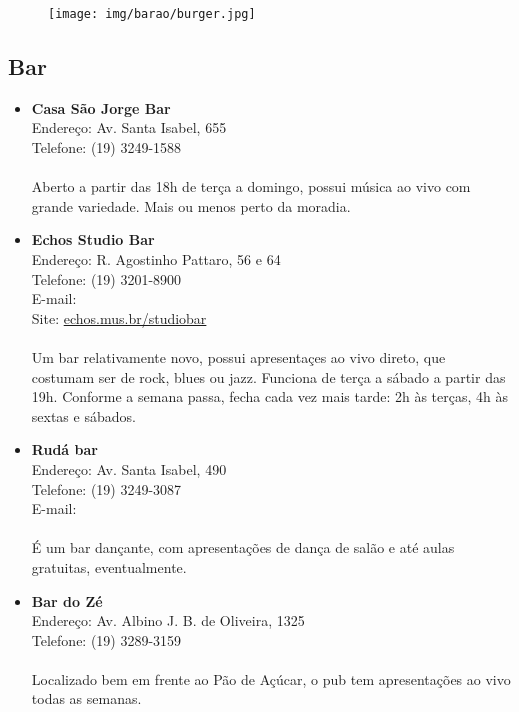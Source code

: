 \begin{figure}[h!]
  \centering
  \texttt{[image: img/barao/burger.jpg]}
\end{figure}

\subsection{Bar}

\begin{itemize}
\item \textbf{Casa São Jorge Bar}
  \\Endereço: Av. Santa Isabel, 655
  \\Telefone: (19) 3249-1588
  \\
  \\Aberto a partir das 18h de terça a domingo, possui música ao vivo com
  grande variedade. Mais ou menos perto da moradia.

\item \textbf{Echos Studio Bar}
  \\Endereço: R. Agostinho Pattaro, 56 e 64
  \\Telefone: (19) 3201-8900
  \\E-mail: 
  \\Site: \url{echos.mus.br/studiobar}
  \\
  \\Um bar relativamente novo, possui apresentaçes ao vivo direto, que costumam
  ser de rock, blues ou jazz. Funciona de terça a sábado a partir das 19h.
  Conforme a semana passa, fecha cada vez mais tarde: 2h às terças, 4h às
  sextas e sábados.

\item \textbf{Rudá bar}
  \\Endereço: Av. Santa Isabel, 490
  \\Telefone: (19) 3249-3087
  \\E-mail: 
  \\
  \\É um bar dançante, com apresentações de dança de salão e até aulas
  gratuitas, eventualmente.

\item \textbf{Bar do Zé}
  \\Endereço: Av. Albino J. B. de Oliveira, 1325
  \\Telefone: (19) 3289-3159
  \\
  \\Localizado bem em frente ao Pão de Açúcar, o pub tem apresentações ao vivo
  todas as semanas.
\end{itemize}

